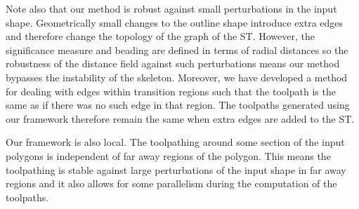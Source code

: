 Note also that our method is robust against small perturbations in the input shape.
Geometrically small changes to the outline shape introduce extra edges and therefore change the topology of the graph of the ST.
However, the significance measure and beading are defined in terms of radial distances so the robustness of the distance field against such perturbations means our method bypasses the instability of the skeleton. 
Moreover, we have developed a method for dealing with edges within transition regions such that the toolpath is the same as if there was no such edge in that region.
The toolpaths generated using our framework therefore remain the same when extra edges are added to the ST.

Our framework is also local.
The toolpathing around some section of the input polygons is independent of far away regions of the polygon.
This means the toolpathing is stable against large perturbations of the input shape in far away regions
and it also allows for some parallelism during the computation of the toolpaths.
























